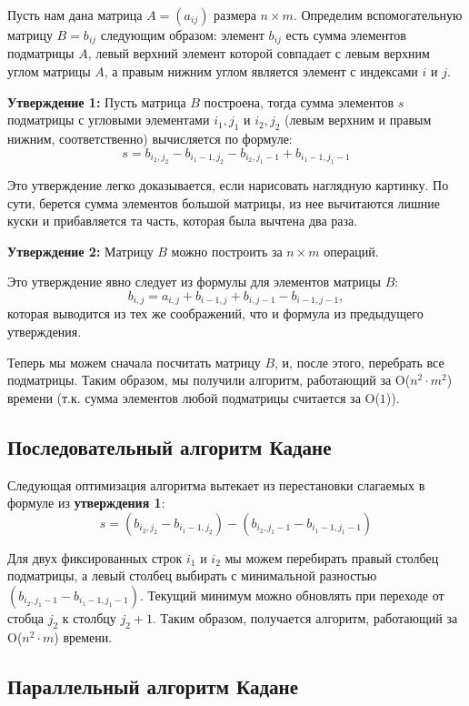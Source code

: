 \documentclass[12pt,a4paper]{article}
\begin{document}
Пусть нам дана матрица $A = (a_{ij})$ размера $n \times m$. Определим вспомогательную матрицу $B = b_{ij}$ следующим образом: элемент $b_{ij}$ есть сумма элементов подматрицы $A$, левый верхний элемент которой совпадает с левым верхним углом матрицы $A$, а правым нижним углом является элемент с индексами $i$ и $j$. 

\smallskip
\textbf{Утверждение 1:} Пусть матрица $B$ построена, тогда сумма элементов $s$ подматрицы с угловыми элементами $i_1, j_1$ и $i_2, j_2$ (левым верхним и правым нижним, соответственно) вычисляется по формуле: 
$$s = b_{i_2, j_2} - b_{i_1-1, j_2} - b_{i_2, j_1 - 1} + b_{i_1 - 1, j_1 - 1}$$

Это утверждение легко доказывается, если нарисовать наглядную картинку. По сути, берется сумма элементов большой матрицы, из нее вычитаются лишние куски и прибавляется та часть, которая была вычтена два раза.

\smallskip
\textbf{Утверждение 2:} Матрицу $B$ можно построить за $n \times m$ операций.

Это утверждение явно следует из формулы для элементов матрицы $B$: 
$$b_{i,j} = a_{i, j} + b_{i-1, j} + b_{i, j-1} - b_{i-1, j-1},$$
которая выводится из тех же соображений, что и формула из предыдущего утверждения.

\smallskip
Теперь мы можем сначала посчитать матрицу $B$, и, после этого, перебрать все подматрицы. Таким образом, мы получили алгоритм, работающий за O($n^2 \cdot m^2$) времени (т.к. сумма элементов любой подматрицы считается за O($1$)).

\subsection{Последовательный алгоритм Кадане}
Следующая оптимизация алгоритма вытекает из перестановки слагаемых в формуле из \textbf{утверждения 1}:
$$s = (b_{i_2, j_2} - b_{i_1-1, j_2}) - (b_{i_2, j_1 - 1} - b_{i_1 - 1, j_1 - 1})$$

Для двух фиксированных строк $i_1$ и $i_2$ мы можем перебирать правый столбец подматрицы, а левый столбец выбирать с минимальной разностью $(b_{i_2, j_1 - 1} - b_{i_1 - 1, j_1 - 1})$. Текущий минимум можно обновлять при переходе от стобца $j_2$ к столбцу $j_2+1$. Таким образом, получается алгоритм, работающий за O($n^2 \cdot m$) времени.

\subsection{Параллельный алгоритм Кадане}
\end{document}
